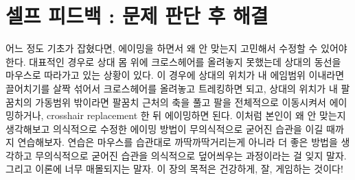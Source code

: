 \section{셀프 피드백 : 문제 판단 후 해결}
어느 정도 기초가 잡혔다면, 에이밍을 하면서 왜 안 맞는지 고민해서 수정할 수 있어야 한다. 대표적인 경우로 상대 몸 위에 크로스헤어를 올려놓지 못했는데 상대의 동선을 마우스로 따라가고 있는 상황이 있다. 이 경우에 상대의 위치가 내 에임범위 이내라면 끌어치기를 살짝 섞어서 크로스헤어를 올려놓고 트레킹하면 되고, 상대의 위치가 내 팔꿈치의 가동범위 밖이라면 팔꿈치 근처의 축을 풀고 팔을 전체적으로 이동시켜서 에이밍하거나, crosshair replacement 한 뒤 에이밍하면 된다. 이처럼 본인이 왜 안 맞는지 생각해보고 의식적으로 수정한 에이밍 방법이 무의식적으로 굳어진 습관을 이길 때까지 연습해보자. 연습은 마우스를 습관대로 까딱까딱거리는게 아니라 더 좋은 방법을 생각하고 무의식적으로 굳어진 습관을 의식적으로 덮어씌우는 과정이라는 걸 잊지 말자. 그리고 이론에 너무 매몰되지는 말자. 이 장의 목적은 건강하게, 잘, 게임하는 것이다!